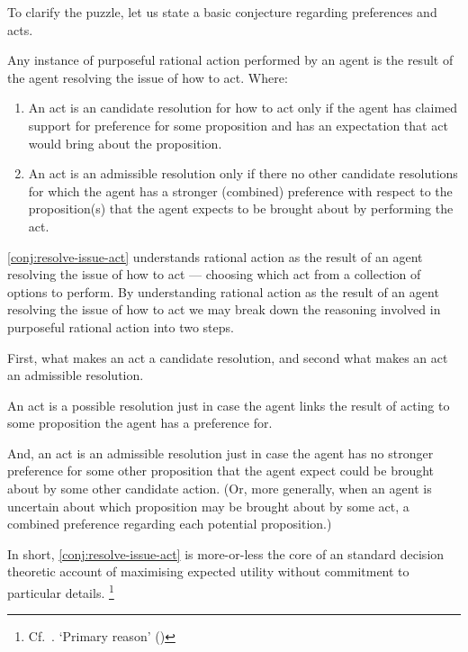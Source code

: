 \begin{note}
  To clarify the puzzle, let us state a basic conjecture regarding preferences and acts.

  \begin{conjecture}\label{conj:resolve-issue-act}
    Any instance of purposeful rational action performed by an agent is the result of the agent resolving the issue of how to act.
    Where:
    \begin{enumerate}
    \item An act is an candidate resolution for how to act only if the agent has claimed support for preference for some proposition and has an expectation that act would bring about the proposition.
    \item An act is an admissible resolution only if there no other candidate resolutions for which the agent has a stronger (combined) preference with respect to the proposition(s) that the agent expects to be brought about by performing the act.
    \end{enumerate}
  \end{conjecture}

  \autoref{conj:resolve-issue-act} understands rational action as the result of an agent resolving the issue of how to act --- choosing which act from a collection of options to perform.
  By understanding rational action as the result of an agent resolving the issue of how to act we may break down the reasoning involved in purposeful rational action into two steps.

  First, what makes an act a candidate resolution, and second what makes an act an admissible resolution.

  An act is a possible resolution just in case the agent links the result of acting to some proposition the agent has a preference for.

  And, an  act is an admissible resolution just in case the agent has no stronger preference for some other proposition that the agent expect could be brought about by some other candidate action.
  (Or, more generally, when an agent is uncertain about which proposition may be brought about by some act, a combined preference regarding each potential proposition.)

  In short, \autoref{conj:resolve-issue-act} is more-or-less the core of an standard decision theoretic account of maximising expected utility without commitment to particular details.\nolinebreak
  \footnote{
    \color{red}
    Cf.\ \textcite{Steele:2020tr}.
    \citeauthor{Davidson:1963aa} `Primary reason' (\citeyear{Davidson:1963aa})
  }
\end{note}

